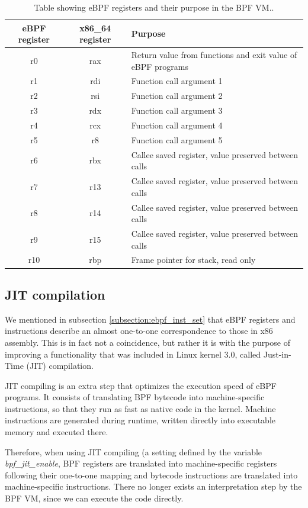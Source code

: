 \documentclass[12pt]{report} %
\begin{document}
\begin{table}[H]
\begin{tabular}{|c|c|m{21em}|}
\hline
eBPF register & x86\_64 register & Purpose\\
\hline
r0 & rax & Return value from functions and exit value of eBPF programs\\
r1 & rdi & Function call argument 1\\
r2 & rsi & Function call argument 2\\
r3 & rdx & Function call argument 3\\
r4 & rcx & Function call argument 4\\
r5 & r8 & Function call argument 5\\
r6 & rbx & Callee saved register, value preserved between calls\\
r7 & r13 & Callee saved register, value preserved between calls\\
r8 & r14 & Callee saved register, value preserved between calls\\
r9 & r15 & Callee saved register, value preserved between calls\\
r10 & rbp & Frame pointer for stack, read only\\
\hline
\end{tabular}
\caption{Table showing eBPF registers and their purpose in the BPF VM.\cite{ebpf_inst_set}\cite{ebpf_starovo_slides}.}
\label{table:ebpf_regs}
\end{table}

\subsection{JIT compilation}
We mentioned in subsection \ref{subsection:ebpf_inst_set} that eBPF registers and instructions describe an almost one-to-one correspondence to those in x86 assembly. This is in fact not a coincidence, but rather it is with the purpose of improving a functionality that was included in Linux kernel 3.0, called Just-in-Time (JIT) compilation\cite{ebpf_JIT}\cite{ebpf_JIT_demystify_page13}.

JIT compiling is an extra step that optimizes the execution speed of eBPF programs. It consists of translating BPF bytecode into machine-specific instructions, so that they run as fast as native code in the kernel. Machine instructions are generated during runtime, written directly into executable memory and executed there\cite{ebpf_JIT_demystify_page14}.

Therefore, when using JIT compiling (a setting defined by the variable \textit{bpf\_jit\_enable}\cite{jit_enable_setting}, BPF registers are translated into machine-specific registers following their one-to-one mapping and bytecode instructions are translated into machine-specific instructions\cite{ebpf_starovo_slides_page23}. There no longer exists an interpretation step by the BPF VM, since we can execute the code directly\cite{brendan_gregg_bpf_book_bpf_vm}.
\end{document}
